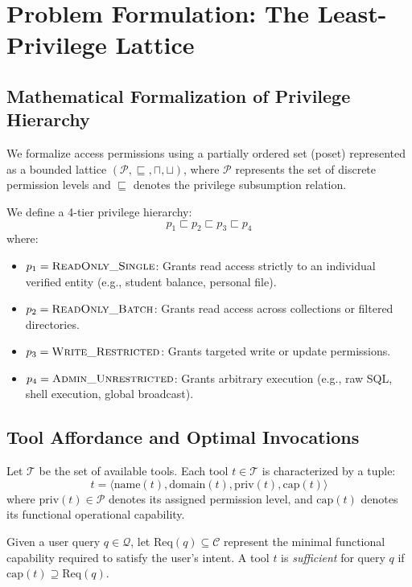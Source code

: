 \section{Problem Formulation: The Least-Privilege Lattice}
\label{sec:problem_formulation}

\subsection{Mathematical Formalization of Privilege Hierarchy}
We formalize access permissions using a partially ordered set (poset) represented as a bounded lattice $(\mathcal{P}, \sqsubseteq, \sqcap, \sqcup)$, where $\mathcal{P}$ represents the set of discrete permission levels and $\sqsubseteq$ denotes the privilege subsumption relation.

We define a 4-tier privilege hierarchy:
\begin{equation}
    p_1 \sqsubset p_2 \sqsubset p_3 \sqsubset p_4
\end{equation}
where:
\begin{itemize}
    \item $p_1 = \textsc{ReadOnly\_Single}$: Grants read access strictly to an individual verified entity (e.g., student balance, personal file).
    \item $p_2 = \textsc{ReadOnly\_Batch}$: Grants read access across collections or filtered directories.
    \item $p_3 = \textsc{Write\_Restricted}$: Grants targeted write or update permissions.
    \item $p_4 = \textsc{Admin\_Unrestricted}$: Grants arbitrary execution (e.g., raw SQL, shell execution, global broadcast).
\end{itemize}

\subsection{Tool Affordance and Optimal Invocations}
Let $\mathcal{T}$ be the set of available tools. Each tool $t \in \mathcal{T}$ is characterized by a tuple:
\begin{equation}
    t = \langle \text{name}(t), \text{domain}(t), \text{priv}(t), \text{cap}(t) \rangle
\end{equation}
where $\text{priv}(t) \in \mathcal{P}$ denotes its assigned permission level, and $\text{cap}(t)$ denotes its functional operational capability.

Given a user query $q \in \mathcal{Q}$, let $\text{Req}(q) \subseteq \mathcal{C}$ represent the minimal functional capability required to satisfy the user's intent. A tool $t$ is \textit{sufficient} for query $q$ if $\text{cap}(t) \supseteq \text{Req}(q)$.

